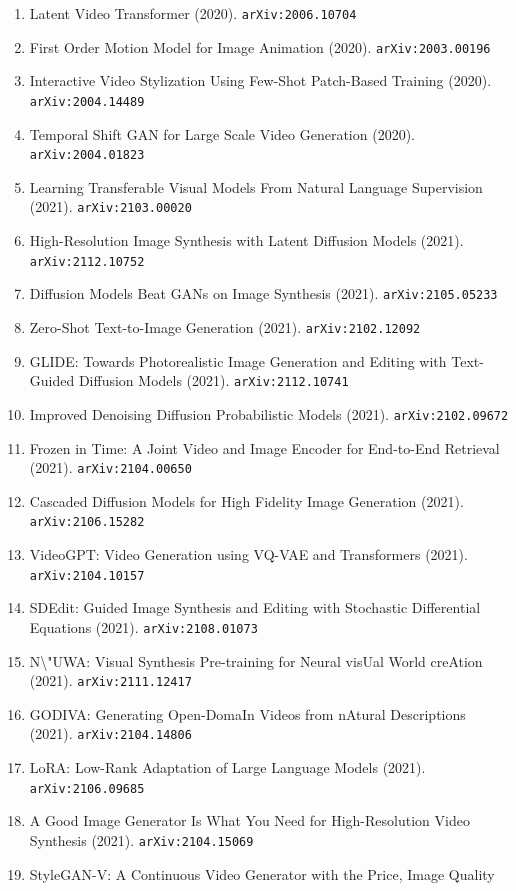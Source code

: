 \documentclass[11pt]{article}
\begin{document}
\begin{enumerate}
  \item Latent Video Transformer (2020). \texttt{arXiv:2006.10704}
  \item First Order Motion Model for Image Animation (2020). \texttt{arXiv:2003.00196}
  \item Interactive Video Stylization Using Few-Shot Patch-Based Training (2020). \texttt{arXiv:2004.14489}
  \item Temporal Shift GAN for Large Scale Video Generation (2020). \texttt{arXiv:2004.01823}
  \item Learning Transferable Visual Models From Natural Language Supervision (2021). \texttt{arXiv:2103.00020}
  \item High-Resolution Image Synthesis with Latent Diffusion Models (2021). \texttt{arXiv:2112.10752}
  \item Diffusion Models Beat GANs on Image Synthesis (2021). \texttt{arXiv:2105.05233}
  \item Zero-Shot Text-to-Image Generation (2021). \texttt{arXiv:2102.12092}
  \item GLIDE: Towards Photorealistic Image Generation and Editing with
  Text-Guided Diffusion Models (2021). \texttt{arXiv:2112.10741}
  \item Improved Denoising Diffusion Probabilistic Models (2021). \texttt{arXiv:2102.09672}
  \item Frozen in Time: A Joint Video and Image Encoder for End-to-End Retrieval (2021). \texttt{arXiv:2104.00650}
  \item Cascaded Diffusion Models for High Fidelity Image Generation (2021). \texttt{arXiv:2106.15282}
  \item VideoGPT: Video Generation using VQ-VAE and Transformers (2021). \texttt{arXiv:2104.10157}
  \item SDEdit: Guided Image Synthesis and Editing with Stochastic Differential
  Equations (2021). \texttt{arXiv:2108.01073}
  \item N\textbackslash{}"UWA: Visual Synthesis Pre-training for Neural visUal World creAtion (2021). \texttt{arXiv:2111.12417}
  \item GODIVA: Generating Open-DomaIn Videos from nAtural Descriptions (2021). \texttt{arXiv:2104.14806}
  \item LoRA: Low-Rank Adaptation of Large Language Models (2021). \texttt{arXiv:2106.09685}
  \item A Good Image Generator Is What You Need for High-Resolution Video
  Synthesis (2021). \texttt{arXiv:2104.15069}
  \item StyleGAN-V: A Continuous Video Generator with the Price, Image Quality

\end{enumerate}
\end{document}

